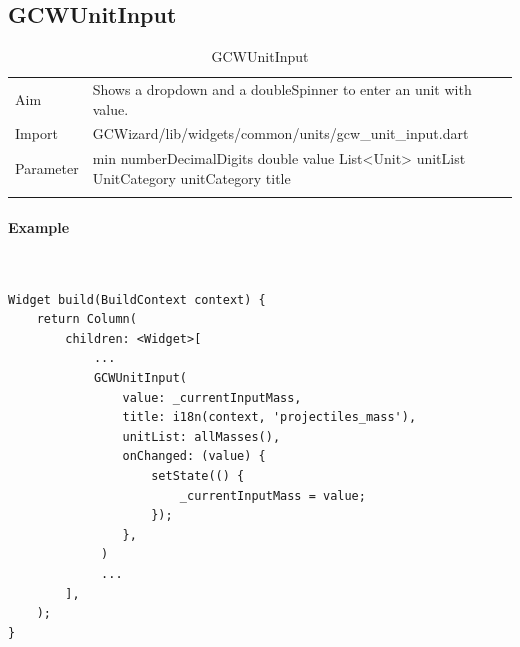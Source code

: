 \subsection{GCWUnitInput}
\label{fig: GCWUnitInput}
\begin{table}[H]
\begin{tabular}[h]{p{2cm}p{9cm}}
    \caption{GCWUnitInput}
    Aim       & Shows a dropdown and a doubleSpinner to enter an unit with value.\\
    Import    & GCWizard/lib/widgets/common/units/gcw\_unit\_input.dart\\
    Parameter & min\newline
                numberDecimalDigits\newline
                double value\newline
                List<Unit> unitList\newline
                UnitCategory unitCategory\newline
                title\\
    \label{tab:GCWUnitInput}
\end{tabular}
\end{table}
\paragraph*{Example} \,
\begin{lstlisting}
Widget build(BuildContext context) {
    return Column(
        children: <Widget>[
            ...
            GCWUnitInput(
                value: _currentInputMass,
                title: i18n(context, 'projectiles_mass'),
                unitList: allMasses(),
                onChanged: (value) {
                    setState(() {
                        _currentInputMass = value;
                    });
                },
             )
             ...
        ],
    );
}
\end{lstlisting}
\label{fig: ExampleGCWUnitInput}

